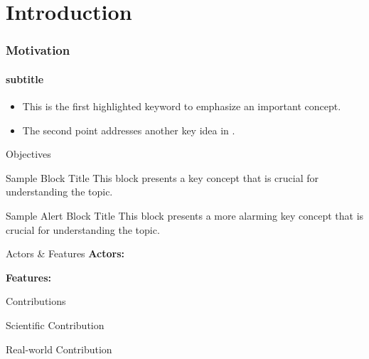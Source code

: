 
\section{Introduction} 

\begin{frame}
	\frametitle{Motivation}
	\framesubtitle{subtitle}
	\begin{itemize} 	
		\item This is the first \alert{highlighted keyword} to emphasize an important concept.
		\item The second point addresses \alert{another key idea} in \cite{knuth:1984}.
	\end{itemize}
	\note{}
\end{frame}

\begin{frame}[label=objectives]{Objectives 
  \hyperlink{scope}{}
}
	\begin{block}{Sample Block Title}
		This block presents a \alert{key concept} that is crucial for understanding the topic.
	\end{block}
	\begin{alertblock}{Sample Alert Block Title}
		This block presents a more alarming \alert{key concept} that is crucial for understanding the topic.
	\end{alertblock}
	\note{}
\end{frame}

\begin{frame}{Actors \& Features}
	\textbf{Actors:}
									
	\textbf{Features:}
	\note{}
\end{frame}


\begin{frame}{Contributions}				
	\begin{block}{Scientific Contribution}
	\end{block}						
	\begin{block}{Real-world Contribution}
	\end{block}					
	\note{}
\end{frame}